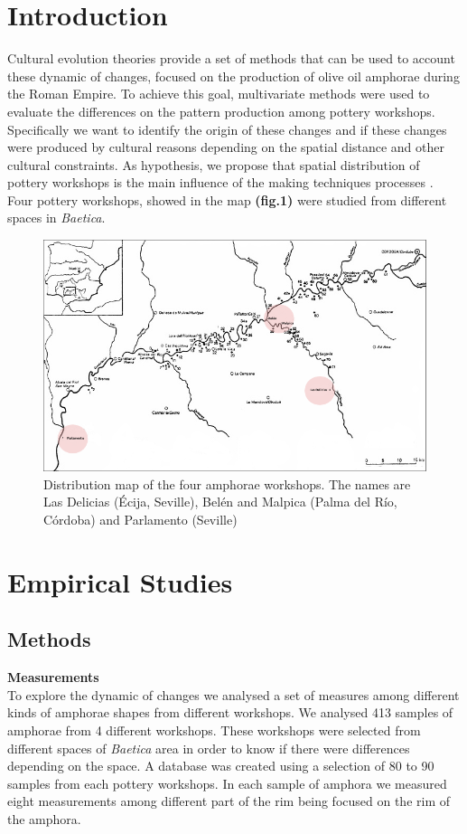 \documentclass[a4paper]{article}
\title{}
\author{}
\date{}
\begin{document}
\section{Introduction}
Cultural evolution theories provide a set of methods that can be used to account these dynamic of changes, focused on the production of olive oil amphorae during the Roman Empire. 
To achieve this goal, multivariate methods were used to evaluate the differences on the pattern production among pottery workshops. \\
Specifically we want to identify the origin of these changes and if these changes were produced by cultural reasons depending on the spatial distance and other cultural constraints. As hypothesis, we propose that spatial distribution of pottery workshops is the main influence of the making techniques processes \cite{schillinger}. Four pottery workshops, showed in the map \textbf{(fig.1)} were studied from different spaces in \emph{Baetica}. 
\begin{figure}[h!]
    \centering
    \includegraphics[width=0.6\linewidth]{images/fig1.png}
    \caption{Distribution map of the four amphorae workshops. The names are Las Delicias (\'Ecija, Seville), Bel\'en and Malpica (Palma del R\'io, C\'ordoba) and Parlamento (Seville)}

\end{figure}

\section{Empirical Studies}
\subsection{Methods}

{\textbf{Measurements}} \\

To explore the dynamic of changes we analysed a set of measures among different kinds of amphorae shapes from different workshops. We analysed 413 samples of amphorae from 4 different workshops. These workshops were selected from different spaces of \emph{Baetica} area in order to know if there were differences depending on the space. A database was created using a selection of 80 to 90 samples from each pottery workshops. In each sample of amphora we measured eight measurements among different part of the rim being focused on the rim of the amphora. 
\end{document}
